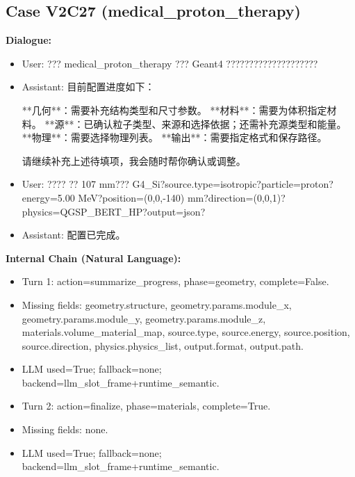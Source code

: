 \documentclass[11pt]{ctexart}
\begin{document}
\subsection{Case V2C27 (medical\_proton\_therapy)}
\textbf{Dialogue:}
\begin{itemize}
\item User: ??? medical\_proton\_therapy ??? Geant4 ????????????????????
\item Assistant: 目前配置进度如下：

**几何**：需要补充结构类型和尺寸参数。  
**材料**：需要为体积指定材料。  
**源**：已确认粒子类型、来源和选择依据；还需补充源类型和能量。  
**物理**：需要选择物理列表。  
**输出**：需要指定格式和保存路径。

请继续补充上述待填项，我会随时帮你确认或调整。
\item User: ???? ?? 107 mm??? G4\_Si?source.type=isotropic?particle=proton?energy=5.00 MeV?position=(0,0,-140) mm?direction=(0,0,1)?physics=QGSP\_BERT\_HP?output=json?
\item Assistant: 配置已完成。
\end{itemize}
\textbf{Internal Chain (Natural Language):}
\begin{itemize}
\item Turn 1: action=summarize\_progress, phase=geometry, complete=False.
\item Missing fields: geometry.structure, geometry.params.module\_x, geometry.params.module\_y, geometry.params.module\_z, materials.volume\_material\_map, source.type, source.energy, source.position, source.direction, physics.physics\_list, output.format, output.path.
\item LLM used=True; fallback=none; backend=llm\_slot\_frame+runtime\_semantic.
\item Turn 2: action=finalize, phase=materials, complete=True.
\item Missing fields: none.
\item LLM used=True; fallback=none; backend=llm\_slot\_frame+runtime\_semantic.
\end{itemize}
\end{document}
